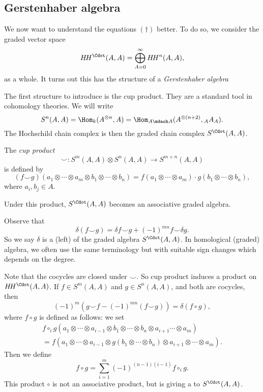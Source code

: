 \documentclass[a4paper]{article}
\newcommand\HH{H\!H}
\begin{document}
\subsection{Gerstenhaber algebra}
We now want to understand the equations $(\dagger)$ better. To do so, we consider the graded vector space
\[
 \HH^\Cdot (A, A) = \bigoplus_{A = 0}^\infty \HH^n(A, A),
\]
as a whole. It turns out this has the structure of a \emph{Gerstenhaber algebra}

The first structure to introduce is the cup product. They are a standard tool in cohomology theories. We will write
\[
  S^n(A, A) = \Hom_k(A^{\otimes n}, A) = \Hom_{A\mdash A} (A^{\otimes (n + 2)}, {_AA_A}).
\]
The Hochschild chain complex is then the graded chain complex $S^{\Cdot}(A, A)$.

\begin{defi}
  The \emph{cup product}
  \[
    \smile: S^m (A, A) \otimes S^n(A, A) \to S^{m + n}(A, A)
  \]
  is defined by
  \[
    (f \smile g)(a_1 \otimes \cdots \otimes a_m \otimes b_1 \otimes \cdots \otimes b_n) = f(a_1 \otimes \cdots \otimes a_m) \cdot g(b_1 \otimes \cdots \otimes b_n),
  \]
  where $a_i, b_j \in A$.
\end{defi}
Under this product, $S^\Cdot(A, A)$ becomes an associative graded algebra.

Observe that
\[
  \delta(f \smile g) = \delta f \smile g + (-1)^{mn} f \smile \delta g.
\]
So we say $\delta$ is a (left)  of the graded algebra $S^\Cdot(A, A)$. In homological (graded) algebra, we often use the same terminology but with suitable sign changes which depends on the degree.

Note that the cocycles are closed under $\smile$. So cup product induces a product on $\HH^\Cdot(A, A)$. If $f \in S^m(A, A)$ and $g \in S^n(A, A)$, and both are cocycles, then
\[
  (-1)^m(g \smile f - (-1)^{mn} (f \smile g)) = \delta (f \circ g),
\]
where $f \circ g$ is defined as follows: we set
\begin{multline*}
  f \circ_i g (a_1 \otimes \cdots \otimes a_{i - 1} \otimes b_1 \otimes \cdots \otimes b_n \otimes a_{i + 1} \cdots \otimes a_m)\\
  = f(a_1 \otimes \cdots \otimes a_{i - 1} \otimes g(b_1 \otimes \cdots \otimes b_n) \otimes a_{i + 1} \otimes \cdots \otimes a_m).
\end{multline*}
Then we define
\[
  f \circ g = \sum_{i = 1}^m (-1)^{(n - 1)(i - 1)} f \circ_i g.
\]
This product $\circ$ is not an associative product, but is giving a  to $S^\Cdot (A, A)$.
\end{document}
